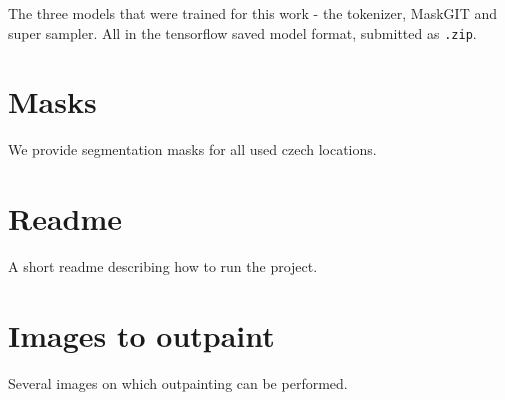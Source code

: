 \documentclass[12pt,a4paper,twoside,openright]{report}
\let\openright=\cleardoublepage
\begin{document}
The three models that were trained for this work - the tokenizer, MaskGIT and super sampler. All in the tensorflow saved model format, submitted as \texttt{.zip}.

\section{Masks}

We provide segmentation masks for all used czech locations.

\section{Readme}

A short readme describing how to run the project.

\section{Images to outpaint}

Several images on which outpainting can be performed.

\openright
\end{document}
